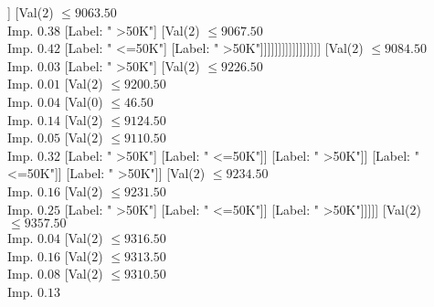 \documentclass[margin=10pt]{standalone}
\begin{document}
\begin{forest}
																																											[Val($2$) $ \leq 9011.50$ \\ Imp. $0.05$
																																												[Val($2$) $ \leq 8990.50$ \\ Imp. $0.02$
																																													[Label: " >50K"]
																																													[Label: " <=50K"]]
																																												[Val($2$) $ \leq 9063.50$ \\ Imp. $0.38$
																																													[Label: " >50K"]
																																													[Val($2$) $ \leq 9067.50$ \\ Imp. $0.42$
																																														[Label: " <=50K"]
																																														[Label: " >50K"]]]]]]]]]]]]]]]]]
																														[Val($2$) $ \leq 9084.50$ \\ Imp. $0.03$
																															[Label: " >50K"]
																															[Val($2$) $ \leq 9226.50$ \\ Imp. $0.01$
																																[Val($2$) $ \leq 9200.50$ \\ Imp. $0.04$
																																	[Val($0$) $ \leq 46.50$ \\ Imp. $0.14$
																																		[Val($2$) $ \leq 9124.50$ \\ Imp. $0.05$
																																			[Val($2$) $ \leq 9110.50$ \\ Imp. $0.32$
																																				[Label: " >50K"]
																																				[Label: " <=50K"]]
																																			[Label: " >50K"]]
																																		[Label: " <=50K"]]
																																	[Label: " >50K"]]
																																[Val($2$) $ \leq 9234.50$ \\ Imp. $0.16$
																																	[Val($2$) $ \leq 9231.50$ \\ Imp. $0.25$
																																		[Label: " >50K"]
																																		[Label: " <=50K"]]
																																	[Label: " >50K"]]]]]
																													[Val($2$) $ \leq 9357.50$ \\ Imp. $0.04$
																														[Val($2$) $ \leq 9316.50$ \\ Imp. $0.16$
																															[Val($2$) $ \leq 9313.50$ \\ Imp. $0.08$
																																[Val($2$) $ \leq 9310.50$ \\ Imp. $0.13$

\end{forest}
\end{document}
